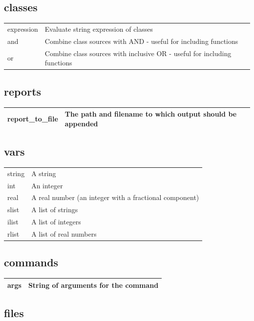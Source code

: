 \subsection{classes}

\begin{longtable}{|l|l|}
\hline
expression & Evaluate string expression of classes\\
and & Combine class sources with AND - useful for including functions\\
or & Combine class sources with inclusive OR - useful for including functions\\
\hline
\end{longtable}

\subsection{reports}

\begin{longtable}{|l|l|}
\hline
report\_to\_file & The path and filename to which output should be appended\\
\hline
\end{longtable}

\subsection{vars}

\begin{longtable}{|l|l|}
\hline
string & A string\\
int & An integer\\
real & A real number (an integer with a fractional component)\\
slist & A list of strings\\
ilist & A list of integers\\
rlist & A list of real numbers\\
\hline
\end{longtable}

\subsection{commands}

\begin{longtable}{|l|l|}
\hline
args & String of arguments for the command\\
\hline
\end{longtable}

\subsection{files}

